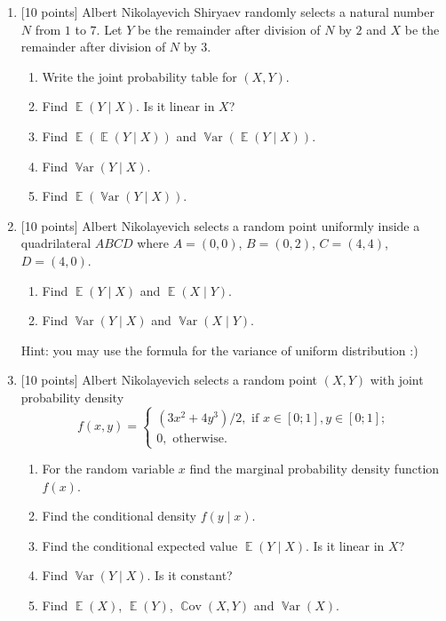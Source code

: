 \documentclass[12pt]{article}
\DeclareMathOperator{\Cov}{\mathbb{C}ov}
\DeclareMathOperator{\Var}{\mathbb{V}ar}
\DeclareMathOperator{\E}{\mathbb{E}}
\begin{document}
\begin{enumerate}

\item {[10 points]} Albert Nikolayevich Shiryaev randomly selects a natural number $N$ from $1$ to $7$.
Let $Y$ be the remainder after division of $N$ by $2$ and $X$ be the remainder after division of $N$ by $3$. 

\begin{enumerate}
    \item Write the joint probability table for $(X, Y)$.
    \item Find $\E(Y \mid X)$. Is it linear in $X$?
    \item Find $\E(\E(Y \mid X))$ and $\Var(\E(Y \mid X))$.
    \item Find $\Var(Y \mid X)$.
    \item Find $\E(\Var(Y \mid X))$.
\end{enumerate}


\item {[10 points]} Albert Nikolayevich selects a random point uniformly inside a quadrilateral $ABCD$ where $A = (0, 0)$, $B = (0, 2)$,
$C = (4, 4)$, $D = (4, 0)$.

\begin{enumerate}
    \item Find $\E(Y \mid X)$ and $\E(X \mid Y)$.
    \item Find $\Var(Y \mid X)$ and $\Var(X \mid Y)$.
\end{enumerate}

Hint: you may use the formula for the variance of uniform distribution :)

\item {[10 points]} Albert Nikolayevich selects a random point $(X, Y)$ with joint probability density
\[
f(x, y) = \begin{cases}
    (3x^2 + 4y^3) / 2, \text{ if } x \in [0;1], y \in [0;1]; \\
    0, \text{ otherwise}. 
\end{cases}
\]
\begin{enumerate}
    \item For the random variable $x$ find the marginal probability density function $f(x)$.
    \item Find the conditional density $f(y \mid x)$.
    \item Find the conditional expected value $\E(Y \mid X)$. Is it linear in $X$?
    \item Find $\Var(Y \mid X)$. Is it constant?
    \item Find $\E(X)$, $\E(Y)$, $\Cov(X, Y)$ and $\Var(X)$.
    

\end{enumerate}
\end{enumerate}
\end{document}
